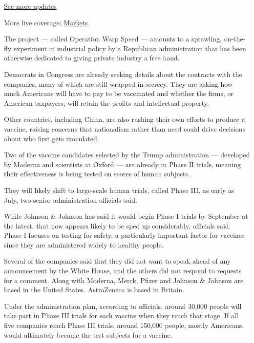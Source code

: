 \href{https://www.nytimes.com/2020/08/01/world/coronavirus-covid-19.html?action=click\&pgtype=Article\&state=default\&region=MAIN_CONTENT_1\&context=storylines_live_updates}{See
more updates}

More live coverage:
\href{https://www.nytimes.com/live/2020/07/31/business/stock-market-today-coronavirus?action=click\&pgtype=Article\&state=default\&region=MAIN_CONTENT_1\&context=storylines_live_updates}{Markets}

The project --- called Operation Warp Speed --- amounts to a sprawling,
on-the-fly experiment in industrial policy by a Republican
administration that has been otherwise dedicated to giving private
industry a free hand.

Democrats in Congress are already seeking details about the contracts
with the companies, many of which are still wrapped in secrecy. They are
asking how much Americans will have to pay to be vaccinated and whether
the firms, or American taxpayers, will retain the profits and
intellectual property.

Other countries, including China, are also rushing their own efforts to
produce a vaccine, raising concerns that nationalism rather than need
could drive decisions about who first gets inoculated.

Two of the vaccine candidates selected by the Trump administration ---
developed by Moderna and scientists at Oxford --- are already in Phase
II trials, meaning their effectiveness is being tested on scores of
human subjects.

They will likely shift to large-scale human trials, called Phase III, as
early as July, two senior administration officials said.

While Johnson \& Johnson has said it would begin Phase I trials by
September at the latest, that now appears likely to be sped up
considerably, officials said. Phase I focuses on testing for safety, a
particularly important factor for vaccines since they are administered
widely to healthy people.

Several of the companies said that they did not want to speak ahead of
any announcement by the White House, and the others did not respond to
requests for a comment. Along with Moderna, Merck, Pfizer and Johnson \&
Johnson are based in the United States. AstraZeneca is based in Britain.

Under the administration plan, according to officials, around 30,000
people will take part in Phase III trials for each vaccine when they
reach that stage. If all five companies reach Phase III trials, around
150,000 people, mostly Americans, would ultimately become the test
subjects for a vaccine.

